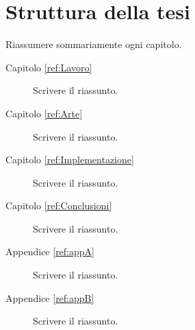 
\section{Struttura della tesi}

Riassumere sommariamente ogni capitolo.

\begin{description}
	\item[Capitolo \ref{ref:Lavoro}] Scrivere il riassunto.

	\item[Capitolo \ref{ref:Arte}] Scrivere il riassunto.

	\item[Capitolo \ref{ref:Implementazione}] Scrivere il riassunto.

	\item[Capitolo \ref{ref:Conclusioni}] Scrivere il riassunto.

	\item[Appendice \ref{ref:appA}] Scrivere il riassunto.

	\item[Appendice \ref{ref:appB}] Scrivere il riassunto.
\end{description}